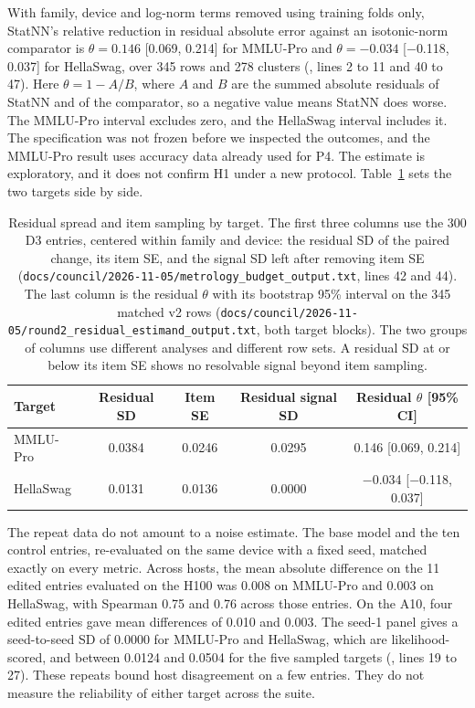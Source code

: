 With family, device and log-norm terms removed using training folds only, StatNN's relative reduction in residual absolute error against an isotonic-norm comparator is $\theta = 0.146$ [0.069, 0.214] for MMLU-Pro and $\theta = -0.034$ [$-$0.118, 0.037] for HellaSwag, over 345 rows and 278 clusters (, lines 2 to 11 and 40 to 47). Here $\theta = 1 - A/B$, where $A$ and $B$ are the summed absolute residuals of StatNN and of the comparator, so a negative value means StatNN does worse. The MMLU-Pro interval excludes zero, and the HellaSwag interval includes it. The specification was not frozen before we inspected the outcomes, and the MMLU-Pro result uses accuracy data already used for P4. The estimate is exploratory, and it does not confirm H1 under a new protocol. Table~\ref{tab:residual} sets the two targets side by side.
\begin{table}[t]
\centering
\small
\begin{tabular}{lcccc}\toprule
Target & Residual SD & Item SE & Residual signal SD & Residual $\theta$ [95\% CI] \\\midrule
MMLU-Pro & 0.0384 & 0.0246 & 0.0295 & 0.146 [0.069, 0.214] \\
HellaSwag & 0.0131 & 0.0136 & 0.0000 & $-$0.034 [$-$0.118, 0.037] \\\bottomrule
\end{tabular}
\caption{Residual spread and item sampling by target. The first three columns use the 300 D3 entries, centered within family and device: the residual SD of the paired change, its item SE, and the signal SD left after removing item SE (\texttt{docs/council/2026-11-05/metrology\_budget\_output.txt}, lines 42 and 44). The last column is the residual $\theta$ with its bootstrap 95\% interval on the 345 matched v2 rows (\texttt{docs/council/2026-11-05/round2\_residual\_estimand\_output.txt}, both target blocks). The two groups of columns use different analyses and different row sets. A residual SD at or below its item SE shows no resolvable signal beyond item sampling.}
\label{tab:residual}
\end{table}

The repeat data do not amount to a noise estimate. The base model and the ten control entries, re-evaluated on the same device with a fixed seed, matched exactly on every metric. Across hosts, the mean absolute difference on the 11 edited entries evaluated on the H100 was 0.008 on MMLU-Pro and 0.003 on HellaSwag, with Spearman 0.75 and 0.76 across those entries. On the A10, four edited entries gave mean differences of 0.010 and 0.003. The seed-1 panel gives a seed-to-seed SD of 0.0000 for MMLU-Pro and HellaSwag, which are likelihood-scored, and between 0.0124 and 0.0504 for the five sampled targets (, lines 19 to 27). These repeats bound host disagreement on a few entries. They do not measure the reliability of either target across the suite.

